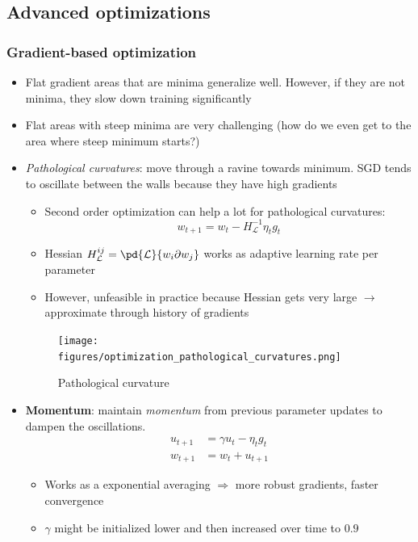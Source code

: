 \subsection{Advanced optimizations}
\subsubsection{Gradient-based optimization}
\begin{itemize}
	\item Flat gradient areas that are minima generalize well. However, if they are not minima, they slow down training significantly
	\item Flat areas with steep minima are very challenging (how do we even get to the area where steep minimum starts?)
	\item \textit{Pathological curvatures}: move through a ravine towards minimum. SGD tends to oscillate between the walls because they have high gradients
	\begin{itemize}
		\item Second order optimization can help a lot for pathological curvatures: $$w_{t+1} = w_{t} - H_{\mathcal{L}}^{-1} \eta_t g_t$$
		\item Hessian $H_{\mathcal{L}}^{ij} = \pd{\mathcal{L}}{w_i\partial w_j}$ works as adaptive learning rate per parameter
		\item However, unfeasible in practice because Hessian gets very large $\rightarrow$ approximate through history of gradients
	\end{itemize}
	\begin{figure}[ht!]
		\centering
		\texttt{[image: figures/optimization\_pathological\_curvatures.png]}
		\caption{Pathological curvature}
		\label{fig:optimization_pathological_curvatures}
	\end{figure}
	\item \textbf{Momentum}: maintain \textit{momentum} from previous parameter updates to dampen the oscillations.
	\begin{equation*}
		\begin{split}
			u_{t+1} & = \gamma u_{t} - \eta_t g_t \\
			w_{t+1} & = w_{t} + u_{t+1}
		\end{split}
	\end{equation*}
	\begin{itemize}
		\item Works as a exponential averaging $\Rightarrow$ more robust gradients, faster convergence
		\item $\gamma$ might be initialized lower and then increased over time to $0.9$

\end{itemize}
\end{itemize}
